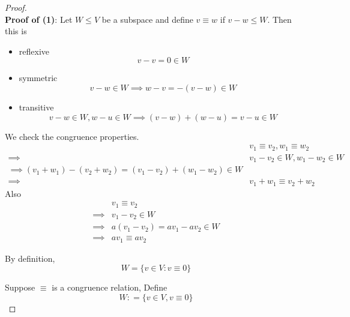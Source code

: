 \begin{proof} \\

    \textbf{Proof of (1)}: Let $W \leq V$ be a subspace and define $v \equiv w$ if $v - w \leq W$. Then this is 
    \begin{itemize}
        \item reflexive 
        \[
            v - v = 0 \in W
        \]
        \item symmetric
        \[
            v - w \in W \implies w - v = - (v - w) \in W
        \]
        \item transitive
        \[
            v - w \in W, w - u \in W \implies (v - w) + (w - u) = v - u \in W 
        \]
    \end{itemize} 

    We check the congruence properties.
    \begin{align*}
        & v_1 \equiv v_2, w_1 \equiv w_2 \\
        \implies & v_1 - v_2 \in W, w_1 - w_2 \in W \\
        \implies (v_1 + w_1) - (v_2 + w_2) = (v_1 - v_2) + (w_1 - w_2) \in W \\
        \implies & v_1 + w_1 \equiv v_2 + w_2
    \end{align*}
    Also
    \begin{align*}
        & v_1 \equiv v_2 \\
        \implies & v_1 - v_2 \in W \\
        \implies & a(v_1 - v_2) = av_1 - av_2 \in W \\
        \implies & av_1 \equiv av_2
    \end{align*}

    By definition, 
    \[
        W = \{ v \in V : v \equiv 0 \} 
    \]

    Suppose $\equiv$ is a congruence relation, Define 
    \[
        W : = \{ v \in V, v \equiv 0 \} 
    \]


\end{proof}
